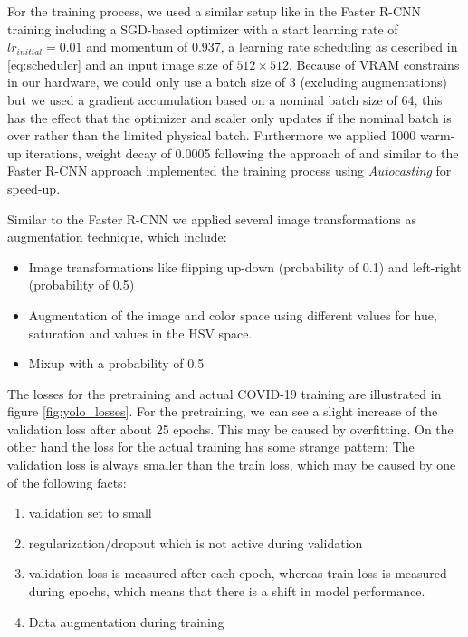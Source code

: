 For the training process, we used a similar setup like in the Faster \ac{R-CNN} training including a \ac{SGD}-based optimizer with a start learning rate of $lr_{initial} = 0.01$ and momentum of 0.937, a learning rate scheduling as described in \ref{eq:scheduler} and an input image size of $512 \times 512$. Because of VRAM constrains in our hardware, we could only use a batch size of 3 (excluding augmentations) but we used a gradient accumulation based on a nominal batch size of 64, this has the effect that the optimizer and scaler only updates if the nominal batch is over rather than the limited physical batch.
Furthermore we applied 1000 warm-up iterations, weight decay of 0.0005 following the approach of \autocite{yolov5} and similar to the Faster \ac{R-CNN} approach implemented the training process using \textit{Autocasting} for speed-up. 
 
Similar to the Faster \ac{R-CNN} we applied several image transformations as augmentation technique, which include:
\begin{itemize}
	\item Image transformations like flipping up-down (probability of 0.1) and left-right (probability of 0.5)
	\item Augmentation of the image and color space using different values for hue, saturation and values in the HSV space. 
	\item Mixup \autocite{zhang2017mixup} with a probability of 0.5
\end{itemize}

The losses for the pretraining and actual COVID-19 training are illustrated in figure \ref{fig:yolo_losses}. For the pretraining, we can see a slight increase of the validation loss after about 25 epochs. This may be caused by overfitting. On the other hand the loss for the actual training has some strange pattern: The validation loss is always smaller than the train loss, which may be caused by one of the following facts:
\begin{enumerate}
	\item validation set to small
	\item regularization/dropout which is not active during validation
	\item validation loss is measured after each epoch, whereas train loss is measured during epochs, which means that there is a shift in model performance.
	\item Data augmentation during training
\end{enumerate}

